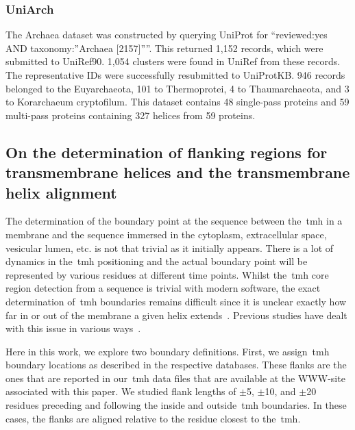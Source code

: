 \subsubsection{UniArch}
The Archaea dataset was constructed by querying UniProt for ``reviewed:yes AND taxonomy:''Archaea [2157]''''.
This returned 1,152 records, which were submitted to UniRef90.
1,054 clusters were found in UniRef from these records.
The representative IDs were successfully resubmitted to UniProtKB.
946 records belonged to the Euyarchaeota, 101 to Thermoprotei, 4 to Thaumarchaeota, and 3 to Korarchaeum cryptofilum.
This dataset contains 48 single-pass proteins and 59 multi-pass proteins containing 327 helices from 59 proteins.


\subsection{On the determination of flanking regions for transmembrane helices and the transmembrane helix alignment}

The determination of the boundary point at the sequence between the~\gls{tmh} in a membrane and the sequence immersed in the cytoplasm, extracellular space, vesicular lumen, etc.
is not that trivial as it initially appears.
There is a lot of dynamics in the~\gls{tmh} positioning and the actual boundary point will be represented by various residues at different time points.
Whilst the~\gls{tmh} core region detection from a sequence is trivial with modern software, the exact determination of~\gls{tmh} boundaries remains difficult since it is unclear exactly how far in or out of the membrane a given helix extends~\cite{Ojemalm2013}.
Previous studies have dealt with this issue in various ways~\cite{Sharpe2010, Baeza-Delgado2013, Pogozheva2013, White2008}.

Here in this work, we explore two boundary definitions.
First, we assign~\gls{tmh} boundary locations as described in the respective databases.
These flanks are the ones that are reported in our~\gls{tmh} data files that are available at the WWW-site associated with this paper.
We studied flank lengths of $\pm$5, $\pm$10, and $\pm$20 residues preceding and following the inside and outside~\gls{tmh} boundaries.
In these cases, the flanks are aligned relative to the residue closest to the~\gls{tmh}.

